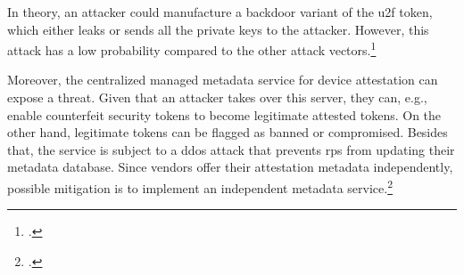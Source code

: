 In theory, an attacker could manufacture a backdoor variant of the \gls{u2f} token, which either leaks or sends all the private keys to the attacker. However, this attack has a low probability compared to the other attack vectors.\footcites[See][3]{DBLP:journals/corr/abs-1810-04660}

Moreover, the centralized managed metadata service for device attestation can expose a threat. Given that an attacker takes over this server, they can, e.g., enable counterfeit security tokens to become legitimate attested tokens. On the other hand, legitimate tokens can be flagged as banned or compromised. Besides that, the service is subject to a \gls{ddos} attack that prevents \glspl{rp} from updating their metadata database. Since vendors offer their attestation metadata independently, possible mitigation is to implement an independent metadata service.\footcites[See][]{fido-metadata}[See][17]{Chang2017OnMU}
